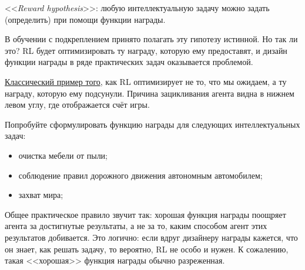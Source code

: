\begin{definition}
<<\emph{Reward hypothesis}>>: любую интеллектуальную задачу можно задать (определить) при помощи функции награды.
\end{definition}

В обучении с подкреплением принято полагать эту гипотезу истинной. Но так ли это? RL будет оптимизировать ту награду, которую ему предоставят, и дизайн функции награды в ряде практических задач оказывается проблемой.

\begin{example}
\href{https://www.youtube.com/watch?v=tlOIHko8ySg}{Классический пример того}, как RL оптимизирует не то, что мы ожидаем, а ту награду, которую ему подсунули. Причина зацикливания агента видна в нижнем левом углу, где отображается счёт игры.
\end{example}

\begin{example}
Попробуйте сформулировать функцию награды для следующих интеллектуальных задач:
\begin{itemize}
    \item очистка мебели от пыли;
    \item соблюдение правил дорожного движения автономным автомобилем;
    \item захват мира;
\end{itemize}
\end{example}

Общее практическое правило звучит так: хорошая функция награды поощряет агента за достигнутые результаты, а не за то, каким способом агент этих результатов добивается. Это логично: если вдруг дизайнеру награды кажется, что он знает, как решать задачу, то вероятно, RL не особо и нужен. К сожалению, такая <<хорошая>> функция награды обычно разреженная.

